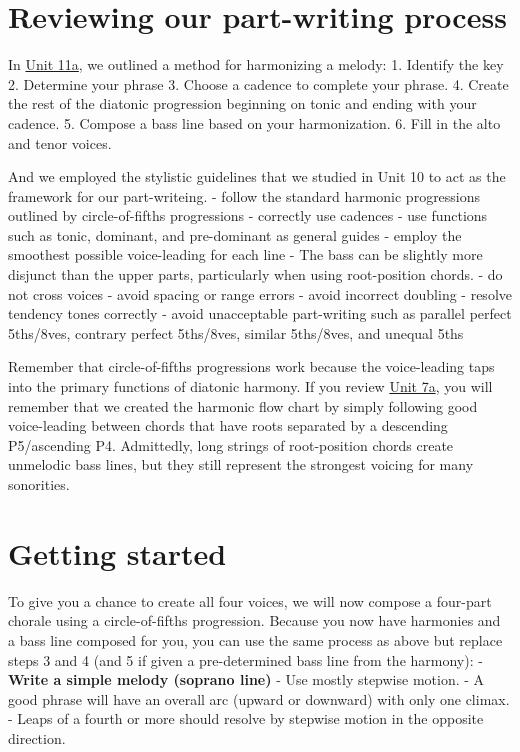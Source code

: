 \documentclass{book}
\begin{document}
\hypertarget{reviewing-our-part-writing-process}{%
\section{Reviewing our part-writing
process}\label{reviewing-our-part-writing-process}}

In \href{11-further-part-writing/a1-funds-of-part-writing.html}{Unit 11a}, we
outlined a method for harmonizing a melody: 1. Identify the key 2. Determine
your phrase 3. Choose a cadence to complete your phrase. 4. Create the rest of
the diatonic progression beginning on tonic and ending with your cadence. 5.
Compose a bass line based on your harmonization. 6. Fill in the alto and tenor
voices.

And we employed the stylistic guidelines that we studied in Unit 10 to act as
the framework for our part-writeing. - follow the standard harmonic
progressions outlined by circle-of-fifths progressions - correctly use
cadences - use functions such as tonic, dominant, and pre-dominant as general
guides - employ the smoothest possible voice-leading for each line - The bass
can be slightly more disjunct than the upper parts, particularly when using
root-position chords. - do not cross voices - avoid spacing or range errors -
avoid incorrect doubling - resolve tendency tones correctly - avoid
unacceptable part-writing such as parallel perfect 5ths/8ves, contrary perfect
5ths/8ves, similar 5ths/8ves, and unequal 5ths

Remember that circle-of-fifths progressions work because the voice-leading
taps into the primary functions of diatonic harmony. If you review
\href{07-harmonic-functions/a1-diaprogcirclefifths.html}{Unit 7a}, you will
remember that we created the harmonic flow chart by simply following good
voice-leading between chords that have roots separated by a descending
P5/ascending P4. Admittedly, long strings of root-position chords create
unmelodic bass lines, but they still represent the strongest voicing for many
sonorities.

\hypertarget{getting-started}{%
\section{Getting started}\label{getting-started}}

To give you a chance to create all four voices, we will now compose a
four-part chorale using a circle-of-fifths progression. Because you now have
harmonies and a bass line composed for you, you can use the same process as
above but replace steps 3 and 4 (and 5 if given a pre-determined bass line
from the harmony): - \textbf{Write a simple melody (soprano line)} - Use
mostly stepwise motion. - A good phrase will have an overall arc (upward or
downward) with only one climax. - Leaps of a fourth or more should resolve by
stepwise motion in the opposite direction.
\end{document}
